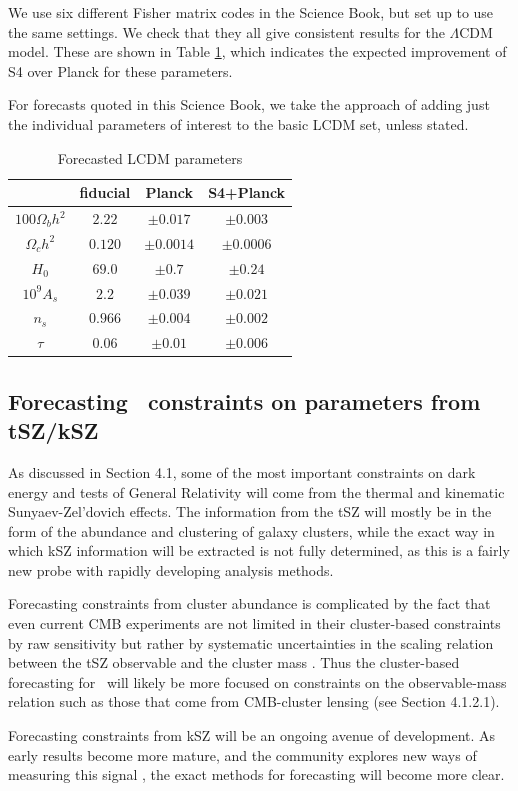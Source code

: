 We use six different Fisher matrix codes in the Science Book, but set up to use the same settings. We check that they all give consistent results for the $\Lambda$CDM model. These are shown in Table \ref{tab:fisher}, which indicates the expected improvement of S4 over Planck for these parameters. 

For forecasts quoted in this Science Book, we take the approach of adding just the individual parameters of interest to the basic LCDM set, unless stated.

\begin{table}
  \centering
\caption{\small Forecasted LCDM parameters}
\begin{tabular}{c  c  c  c  }
\hline
\hline
  & fiducial & Planck &  S4+Planck \\
 \hline
$100\Omega_bh^2$   & $2.22$ & $\pm 0.017$ & $\pm 0.003$ \\
$\Omega_ch^2$      & $0.120$ &$\pm 0.0014$  & $\pm 0.0006$  \\
$H_0$              & $69.0$ &  $\pm 0.7$     & $\pm 0.24$    \\
$10^{9}A_s$        & $2.2$  &$\pm 0.039$   & $\pm0.021$  \\
$n_s$             & $0.966$&  $\pm 0.004$   & $\pm0.002$ \\
$\tau$            & $0.06$ &  $\pm 0.01$   & $\pm0.006$ \\
\hline
\end{tabular}
\label{tab:fisher}
  \end{table}




\subsection{Forecasting \cmbexp\ constraints on parameters from tSZ/kSZ}

As discussed in Section 4.1, some of the most important constraints on dark energy and tests of 
General Relativity will come from the thermal and kinematic Sunyaev-Zel'dovich effects. The information
from the tSZ will mostly be in the form of the abundance and clustering of galaxy clusters, while the 
exact way in which kSZ information will be extracted is not fully determined, as this is a fairly new probe
with rapidly developing analysis methods.

Forecasting constraints from cluster abundance is complicated by the fact that even current CMB 
experiments are not limited in their cluster-based constraints by raw sensitivity but rather by systematic
uncertainties in the scaling relation between the tSZ observable and the cluster mass 
\cite{Reichardt:2012yj,Ade:2015fva}. Thus the cluster-based forecasting for \cmbexp\ will likely be more
focused on constraints on the observable-mass relation such as those that come from CMB-cluster
lensing (see Section 4.1.2.1).

Forecasting constraints from kSZ will be an ongoing avenue of development. As early results become
more mature, and the community explores new ways of measuring this signal 
\cite{Hand:2012ui,Keisler:2012eg,Ade:2015lza,Schaan:2015uaa,Hill:2016dta,Soergel:2016mce}, the exact methods for forecasting
will become more clear.
